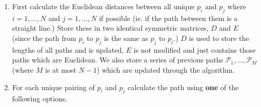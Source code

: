 \documentclass[a4paper,10pt]{article}
\begin{document}
\begin{enumerate}
\item First calculate the Euclidean distances between all unique $p_i$ and $p_j$ where $i=1,\dots, N$ and $j=1,\dots, N$ if possible (ie. if the path between them is a straight line.) Store these in two identical symmetric matrices, $D$ and $E$ (since the path from  $p_i$ to $p_j$ is the same as  $p_j$ to $p_i$.) $D$ is used to store the lengths of all paths and is updated, $E$ is not modified and just contains those paths which are Euclidean. We also store a series of previous paths $\mathcal{P}_1,\ldots, \mathcal{P}_M$ (where $M$ is at most $N-1$) which are updated through the algorithm.

\item For each unique pairing of $p_i$ and $p_j$ calculate the path using \textbf{one} of the following options.

\begin{enumerate}






\end{enumerate}
\end{enumerate}
\end{document}
